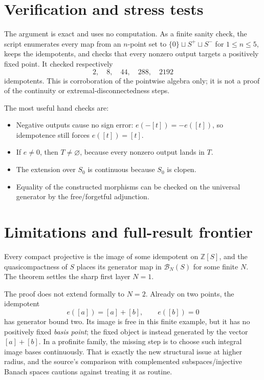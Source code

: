 \documentclass[11pt]{article}
\newcommand{\Z}{\mathbb Z}
\newcommand{\Ball}{\mathcal B}
\begin{document}
\section{Verification and stress tests}

The argument is exact and uses no computation.  As a finite sanity check, the
script  enumerates every map
from an $n$-point set to $\{0\}\sqcup S^+\sqcup S^-$ for $1\leq n\leq5$,
keeps the idempotents, and checks that every nonzero output targets a
positively fixed point.  It checked respectively
\[
 2,\quad 8,\quad 44,\quad 288,\quad 2192
\]
idempotents.  This is corroboration of the pointwise algebra only; it is not
a proof of the continuity or extremal-disconnectedness steps.

The most useful hand checks are:
\begin{itemize}
\item Negative outputs cause no sign error: $e(-[t])=-e([t])$, so
idempotence still forces $e([t])=[t]$.
\item If $e\neq0$, then $T\neq\varnothing$, because every nonzero output
lands in $T$.
\item The extension over $S_0$ is continuous because $S_0$ is clopen.
\item Equality of the constructed morphisms can be checked on the universal
generator by the free/forgetful adjunction.
\end{itemize}

\section{Limitations and full-result frontier}

Every compact projective is the image of some idempotent on $\Z[S]$, and the
quasicompactness of $S$ places its generator map in $\Ball_N(S)$ for some
finite $N$.  The theorem settles the sharp first layer $N=1$.

The proof does not extend formally to $N=2$.  Already on two points, the
idempotent
\[
 e([a])=[a]+[b],\qquad e([b])=0
\]
has generator bound two.  Its image is free in this finite example, but it has
no positively fixed \emph{basis point}; the fixed object is instead generated
by the vector $[a]+[b]$.  In a profinite family, the missing step is to choose
such integral image bases continuously.  That is exactly the new structural
issue at higher radius, and the source's comparison with complemented
subspaces/injective Banach spaces cautions against treating it as routine.
\end{document}

